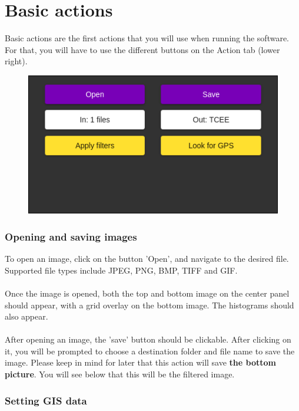 \documentclass[12pt,a4paper]{article}
\begin{document}
\part{Basic actions}
\setcounter{section}{0}

Basic actions are the first actions that you will use when running the software. For that, you will have to use the different buttons on the Action tab (lower right).

\begin{figure}[H]
	\includegraphics[scale=0.6]{action_tab}
	\centering
\end{figure}

\section{Opening and saving images}

To open an image, click on the button 'Open', and navigate to the desired file. Supported file types include JPEG, PNG, BMP, TIFF and GIF.\\
~\\
Once the image is opened, both the top and bottom image on the center panel should appear, with a grid overlay on the bottom image. The histograms should also appear.\\
~\\
After opening an image, the 'save' button should be clickable. After clicking on it, you will be prompted to choose a destination folder and file name to save the image. Please keep in mind for later that this action will save \textbf{the bottom picture}. You will see below that this will be the filtered image.

\section{Setting GIS data}
\end{document}
